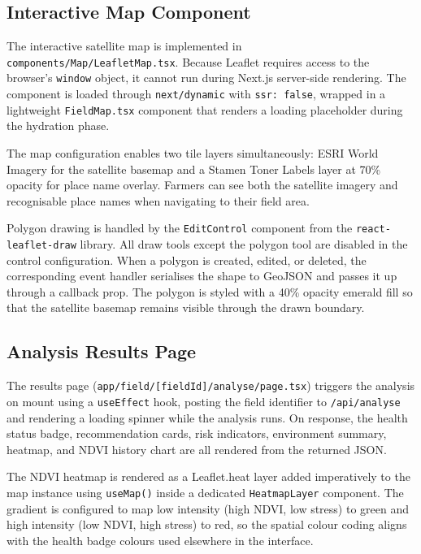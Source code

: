 \subsection{Interactive Map Component}

The interactive satellite map is implemented in \texttt{components/Map/LeafletMap.tsx}. Because Leaflet requires access to the browser's \texttt{window} object, it cannot run during Next.js server-side rendering. The component is loaded through \texttt{next/dynamic} with \texttt{ssr: false}, wrapped in a lightweight \texttt{FieldMap.tsx} component that renders a loading placeholder during the hydration phase.

The map configuration enables two tile layers simultaneously: ESRI World Imagery for the satellite basemap and a Stamen Toner Labels layer at 70\% opacity for place name overlay. Farmers can see both the satellite imagery and recognisable place names when navigating to their field area.

Polygon drawing is handled by the \texttt{EditControl} component from the \texttt{react-leaflet-draw} library. All draw tools except the polygon tool are disabled in the control configuration. When a polygon is created, edited, or deleted, the corresponding event handler serialises the shape to GeoJSON and passes it up through a callback prop. The polygon is styled with a 40\% opacity emerald fill so that the satellite basemap remains visible through the drawn boundary.

\subsection{Analysis Results Page}

The results page (\texttt{app/field/[fieldId]/analyse/page.tsx}) triggers the analysis on mount using a \texttt{useEffect} hook, posting the field identifier to \texttt{/api/analyse} and rendering a loading spinner while the analysis runs. On response, the health status badge, recommendation cards, risk indicators, environment summary, heatmap, and NDVI history chart are all rendered from the returned JSON.

The NDVI heatmap is rendered as a Leaflet.heat layer added imperatively to the map instance using \texttt{useMap()} inside a dedicated \texttt{HeatmapLayer} component. The gradient is configured to map low intensity (high NDVI, low stress) to green and high intensity (low NDVI, high stress) to red, so the spatial colour coding aligns with the health badge colours used elsewhere in the interface.

